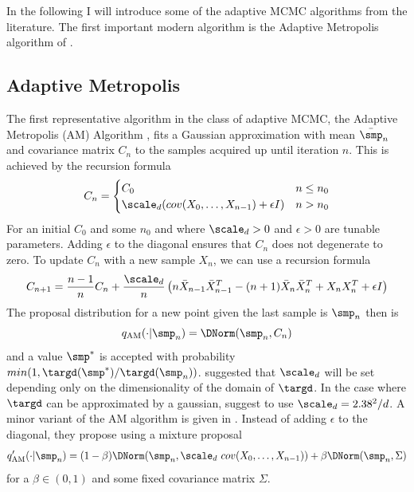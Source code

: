 In the following I will introduce some of the adaptive MCMC algorithms from the literature. The first important modern algorithm is the Adaptive Metropolis algorithm of \cite{Haario2001}.

\subsection{Adaptive Metropolis}
The first representative algorithm in the class of adaptive MCMC, the Adaptive Metropolis (AM) Algorithm \cite{Haario2001}, fits a Gaussian approximation with mean $\bar{\smp}_{n}$ and covariance matrix $C_n$ to the samples acquired up until iteration $n$. This is achieved by the recursion formula
\begin{equation}
\label{eq:haario_cov}
C_n = \begin{cases}
C_0 & n \leq n_0 \\
\scale_d (cov(X_0,\dots, X_{n-1}) + \epsilon I)& n > n_0
\end{cases}
\end{equation}
For an initial $C_0$ and some $n_0$ and where $\scale_d>0$ and $\epsilon>0$ are tunable parameters. Adding $\epsilon$ to the diagonal ensures that $C_n$ does not degenerate to zero. To update $C_n$ with a new sample $X_n$, we can use a recursion formula 
\begin{equation*}
C_{n+1} = \frac{n-1}{n} C_n + \frac{\scale_d}{n} \left (n\bar{X}_{n-1}\bar{X}^T_{n-1} - (n+1) \bar{X}_{n}\bar{X}^T_{n} + {X}_{n}{X}^T_{n}  + \epsilon I\right )
\end{equation*}
The proposal distribution for a new point given the last sample is $\smp_n$ then is
\begin{equation}
\label{eq:am_prop_orig}
q_\textrm{AM}(\cdot|\smp_n) = \DNorm(\smp_n, C_n)
\end{equation}
and a value $\smp^*$ is accepted with probability $min(1,\targd(\smp^*)/\targd(\smp_n))$. \cite{Haario2001} suggested that $\scale_d$ will be set depending only on the dimensionality of the domain of $\targd$. In the case where $\targd$ can be approximated by a gaussian, \cite{Rosenthal2011}  suggest to use $\scale_d = 2.38^2/d$. A minor variant of the AM algorithm is given in \cite{Roberts2009}. Instead of adding $\epsilon$ to the diagonal, they propose using a mixture proposal
\begin{equation}
\label{eq:am_prop_mod}
q'_\textrm{AM}(\cdot|\smp_n)  = (1-\beta)\DNorm(\smp_n, \scale_d~cov(X_0,\dots, X_{n-1}) ) + \beta \DNorm(\smp_n, \Sigma)
\end{equation}
 for a $\beta \in (0,1)$ and some fixed covariance matrix $\Sigma$.
 

